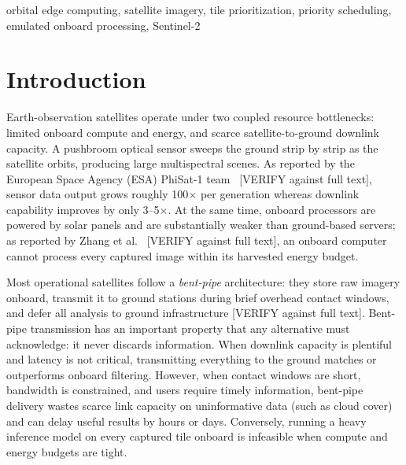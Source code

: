 \documentclass[conference]{IEEEtran}
\begin{document}
\begin{IEEEkeywords}
orbital edge computing, satellite imagery, tile prioritization, priority scheduling, emulated onboard processing, Sentinel-2
\end{IEEEkeywords}

\section{Introduction}

Earth-observation satellites operate under two coupled resource bottlenecks: limited onboard compute and energy, and scarce satellite-to-ground downlink capacity. A pushbroom optical sensor sweeps the ground strip by strip as the satellite orbits, producing large multispectral scenes. As reported by the European Space Agency (ESA) PhiSat-1 team~\cite{phisat1} [VERIFY against full text], sensor data output grows roughly 100$\times$ per generation whereas downlink capability improves by only 3--5$\times$. At the same time, onboard processors are powered by solar panels and are substantially weaker than ground-based servers; as reported by Zhang et al.~\cite{targetfuse} [VERIFY against full text], an onboard computer cannot process every captured image within its harvested energy budget.

Most operational satellites follow a \emph{bent-pipe} architecture: they store raw imagery onboard, transmit it to ground stations during brief overhead contact windows, and defer all analysis to ground infrastructure [VERIFY against full text]. Bent-pipe transmission has an important property that any alternative must acknowledge: it never discards information. When downlink capacity is plentiful and latency is not critical, transmitting everything to the ground matches or outperforms onboard filtering. However, when contact windows are short, bandwidth is constrained, and users require timely information, bent-pipe delivery wastes scarce link capacity on uninformative data (such as cloud cover) and can delay useful results by hours or days. Conversely, running a heavy inference model on every captured tile onboard is infeasible when compute and energy budgets are tight.
\end{document}
